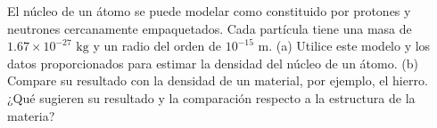 \item El núcleo de un átomo se puede modelar como constituido por protones y neutrones cercanamente empaquetados. Cada partícula tiene una masa de $1.67 \times 10^{-27} \text{ kg}$ y un radio del orden de $10^{-15} \text{ m}$. (a) Utilice este modelo y los datos proporcionados para estimar la densidad del núcleo de un átomo. (b) Compare su resultado con la densidad de un material, por ejemplo, el hierro. ¿Qué sugieren su resultado y la comparación respecto a la estructura de la materia?
